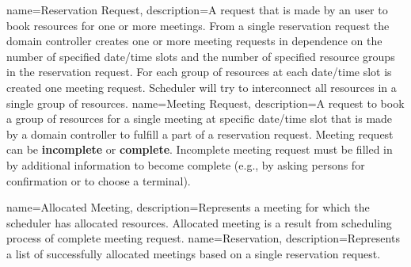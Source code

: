 %
%
{
  name=Reservation Request,
  description={A request that is made by an user to book resources for one or 
    more meetings.  From a single reservation request the domain controller 
    creates one or more meeting requests in dependence on the number of 
    specified date/time slots and the number of specified resource groups in 
    the reservation request. For each group of resources at each date/time slot 
    is created one meeting request. Scheduler will try to interconnect all 
    resources in a single group of resources.}
}
{
  name=Meeting Request,
  description={A request to book a group of resources for a single meeting at 
    specific date/time slot that is made by a domain controller to fulfill a 
    part of a reservation request. Meeting request can be \textbf{incomplete} 
    or \textbf{complete}. Incomplete meeting request must be filled in by 
    additional information to become complete (e.g., by asking persons for 
    confirmation or to choose a terminal).}
}

{
  name=Allocated Meeting,
  description={Represents a meeting for which the scheduler has allocated 
    resources. Allocated meeting is a result from scheduling process of 
    complete meeting request.}
}
{
  name=Reservation,
  description={Represents a list of successfully allocated meetings based on a 
    single reservation request.}
}

%
%

